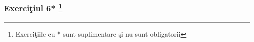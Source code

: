 \documentclass[]{article}
\let\rmarkdownfootnote\footnote%
\def\footnote{\protect\rmarkdownfootnote}
\begin{document}
\subsubsection[Exerci\c tiul 6* ]{\texorpdfstring{Exerci\c tiul 6*
\footnote{Exerci\c tiile cu * sunt suplimentare \c si nu sunt
  obligatorii}}{Exerciiul 6* }}\label{exerciiul-6}
\end{document}
